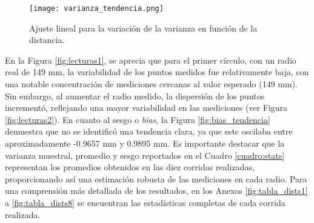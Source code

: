 \begin{table}[H]
	\centering
	\caption{Estadísticas de precisión: valores promedio de distancia, sesgo y varianza muestral obtenidos para cada radio tras las diez corridas realizadas.} 
	\label{cuadro:stats}
\end{table}

\begin{figure}[H]
	\centering
	\texttt{[image: varianza\_tendencia.png]}
	\caption{Ajuste lineal para la variación de la varianza en función de la distancia.}
	\label{fig:varianza_tendencia}
\end{figure}

En la Figura \ref{fig:lecturas1}, se aprecia que para el primer círculo, con un radio real de 149 mm, la variabilidad de los puntos medidos fue relativamente baja, con una notable concentración de mediciones cercanas al valor esperado (149 mm). Sin embargo, al aumentar el radio medido, la dispersión de los puntos incrementó, reflejando una mayor variabilidad en las mediciones (ver Figura \ref{fig:lecturas2}). En cuanto al sesgo o \textit{bias}, la Figura \ref{fig:bias_tendencia} demuestra que no se identificó una tendencia clara, ya que este oscilaba entre aproximadamente -0.9657 mm y 0.9895 mm. Es importante destacar que la varianza muestral, promedio y sesgo reportados en el Cuadro \ref{cuadro:stats} representan los promedios obtenidos en las diez corridas realizadas, proporcionando así una estimación robusta de las mediciones en cada radio. Para una comprensión más detallada de los resultados, en los Anexos \ref{fig:tabla_dists1} a \ref{fig:tabla_dists8} se encuentran las estadísticas completas de cada corrida realizada.



